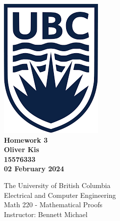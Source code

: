 \documentclass[letterpaper, 12pt]{article}
\newcommand{\myname}{Oliver Kis}
\newcommand{\mystudentnumber}{15576333}
\newcommand{\hw}{3} %
\newcommand{\dates}{02 February 2024}
\theoremstyle{definition}
\begin{document}
\begin{titlepage}
\centering
    \includegraphics{UBC.png}\\
    \vspace{1cm}
    {\bfseries\large
    Homework \hw \\
    \vspace{0.5cm}
    \myname\\
    \vspace{0.5cm}
    \mystudentnumber\\
    \vspace{0.5cm}
    \dates\\  %
    }
    
    \vfill
    {\large
    The University of British Columbia\\
    \vspace{0.25cm}
    Electrical and Computer Engineering\\
    \vspace{0.25cm}
    Math 220 - Mathematical Proofs\\
    \vspace{0.25cm}
    Instructor: Bennett Michael\\
    }


\end{titlepage}
\end{document}
